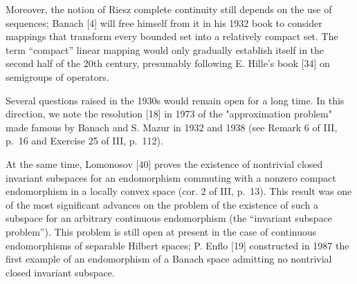Moreover, the notion of Riesz complete continuity still depends on the use of sequences; Banach [4] will free himself from it in his 1932 book to consider mappings that transform every bounded set into a relatively compact set. The term “compact” linear mapping would only gradually establish itself in the second half of the 20th century, presumably following E. Hille's book [34] on semigroups of operators.

Several questions raised in the 1930s would remain open for a long time. In this direction, we note the resolution [18] in 1973 of the "approximation problem" made famous by Banach and S. Mazur in 1932 and 1938 (see Remark 6 of III, p.~16 and Exercise 25 of III, p.~112).

At the same time, Lomonosov [40] proves the existence of nontrivial closed invariant subspaces for an endomorphism commuting with a nonzero compact endomorphism in a locally convex space (cor. 2 of III, p.~13). This result was one of the most significant advances on the problem of the existence of such a subspace for an arbitrary continuous endomorphism (the “invariant subspace problem”). This problem is still open at present in the case of continuous endomorphisms of separable Hilbert spaces; P. Enflo [19] constructed in 1987 the first example of an endomorphism of a Banach space admitting no nontrivial closed invariant subspace.
\relax{}
